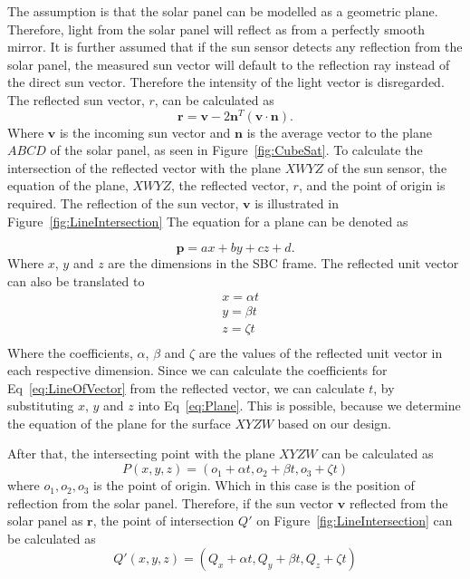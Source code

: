 The assumption is that the solar panel can be modelled as a geometric plane. Therefore, light from the solar panel will reflect as from a perfectly smooth mirror. It is further assumed that if the sun sensor detects any reflection from the solar panel, the measured sun vector will default to the reflection ray instead of the direct sun vector. Therefore the intensity of the light vector is disregarded. The reflected sun vector, $r$, can be calculated as
\begin{equation}
	\mathbf{r} = \mathbf{v} - 2\mathbf{n}^T(\mathbf{v} \cdot \mathbf{n}).
\end{equation}
Where $\mathbf{v}$ is the incoming sun vector and $\mathbf{n}$ is the average vector to the plane $ABCD$ of the solar panel, as seen in Figure~\ref{fig:CubeSat}. To calculate the intersection of the reflected vector with the plane $XWYZ$ of the sun sensor, the equation of the plane, $XWYZ$, the reflected vector, $r$, and the point of origin is required. The reflection of the sun vector, $\mathbf{v}$ is illustrated in Figure~\ref{fig:LineIntersection} The equation for a plane can be denoted as

\begin{equation}
	\mathbf{p} = ax + by + cz + d.
	\label{eq:Plane}
\end{equation}
Where $x$, $y$ and $z$ are the dimensions in the SBC frame. The reflected unit vector can also be translated to 
\begin{equation}
	\begin{aligned}
		&	x = \alpha t \\
		&	y = \beta t \\
		&	z = \zeta t \\
	\end{aligned}
	\label{eq:LineOfVector}
\end{equation}
Where the coefficients, $\alpha$, $\beta$ and $\zeta$ are the values of the reflected unit vector in each respective dimension. Since we can calculate the coefficients for Eq~\ref{eq:LineOfVector} from the reflected vector, we can calculate $t$, by substituting $x$, $y$ and $z$ into Eq~\ref{eq:Plane}. This is possible, because we determine the equation of the plane for the surface $XYZW$ based on our design. 

After that, the intersecting point with the plane $XYZW$ can be calculated as
\begin{equation}
	P(x, y, z) = (o_1 + \alpha t, o_2 + \beta t, o_3 + \zeta t)
	\label{eq:Intersection}
\end{equation}
where $o_1, o_2, o_3$ is the point of origin. Which in this case is the position of reflection from the solar panel. Therefore, if the sun vector $\mathbf{v}$ reflected from the solar panel as $\mathbf{r}$, the point of intersection $Q'$ on Figure~\ref{fig:LineIntersection} can be calculated as
\begin{equation}
	Q'(x, y, z) = (Q_x + \alpha t, Q_y + \beta t, Q_z + \zeta t)
	\label{eq:SpecificIntersection}
\end{equation}

